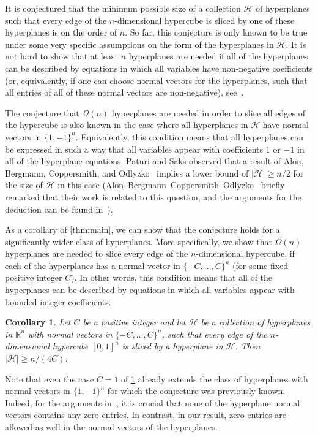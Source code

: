 \documentclass{amsart}
\newtheorem{corollary}[theorem]{Corollary}
\theoremstyle{remark}
\numberwithin{theorem}{section}
\renewcommand{\(}{\bigl(}
\renewcommand{\)}{\bigr)\vphantom{)}}
\newcommand{\cH}{\mathcal H}
\renewcommand{\ge}{\geqslant}
\begin{document}
It is conjectured that the minimum possible size of a collection $\cH$ of hyperplanes such that every edge of the $n$-dimensional hypercube is sliced by one of these hyperplanes is on the order of $n$. So far, this conjecture is only known to be true under some very specific assumptions on the form of the hyperplanes in $\cH$. It is not hard to show that at least $n$ hyperplanes are needed if all of the hyperplanes can be described by equations in which all variables have non-negative coefficients (or, equivalently, if one can choose normal vectors for the hyperplanes, such that all entries of all of these normal vectors are non-negative), see~\cite{AHLSWEDE1990137,GotsmanLinial94}.

The conjecture that $\Omega(n)$ hyperplanes are needed in order to slice all edges of the hypercube is also known in the case where all hyperplanes in $\cH$ have normal vectors in $\{1,-1\}^n$. Equivalently, this condition means that all hyperplanes can be expressed in such a way that all variables appear with coefficients $1$ or $-1$ in all of the hyperplane equations. Paturi and Saks observed that a result of Alon, Bergmann, Coppersmith, and Odlyzko~\cite{alon88balance} implies a lower bound of $|\cH|\ge n/2$ for the size of $\cH$ in this case (Alon--Bergmann--Coppersmith--Odlyzko~\cite{alon88balance} briefly remarked that their work is related to this question, and the arguments for the deduction can be found in~\cite[Proposition~3.75]{saks1993}).


As a corollary of \cref{thm:main}, we can show that the conjecture holds for a significantly wider class of hyperplanes. More specifically, we show that $\Omega(n)$ hyperplanes are needed to slice every edge of the $n$-dimensional hypercube, if  each of the hyperplanes has a normal vector in $\{-C, \dots, C\}^n$ (for some fixed positive integer $C$). In other words, this condition means that all of the hyperplanes can be described by equations in which all variables appear with bounded integer coefficients. 

\begin{corollary}\label{cor:slicing}
    Let $C$ be a positive integer and let $\cH $ be a collection of hyperplanes in $\mathbb{R}^n$ with normal vectors in $\{-C, \dots, C\}^n$, such that every edge of the $n$-dimensional hypercube $[0,1]^n$ is sliced by a hyperplane in $\cH$. Then $|\cH|\ge n/(4C)$.
\end{corollary}

Note that even the case $C=1$ of \cref{cor:slicing} already extends the class of hyperplanes with normal vectors in $\{1,-1\}^n$ for which the conjecture was previously known. Indeed, for the arguments in~\cite{alon88balance}, it is crucial that none of the hyperplane normal vectors contains any zero entries. In contrast, in our result, zero entries are allowed as well in the normal vectors of the hyperplanes.
\end{document}
